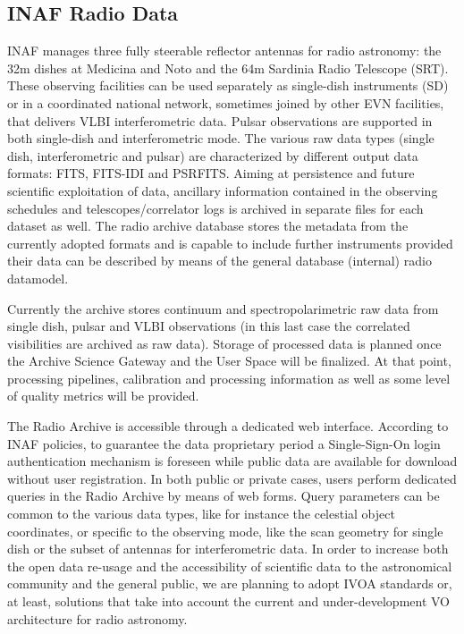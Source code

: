 \documentclass[11pt,a4paper]{ivoa}
\begin{document}
\subsection{INAF Radio Data}
\label{sec:INAF}
INAF manages three fully steerable reflector antennas for radio astronomy: the 32m dishes at Medicina and Noto and the 64m Sardinia Radio Telescope (SRT). These observing facilities can be used separately as single-dish instruments (SD) or in a coordinated national network, sometimes joined by other EVN facilities, that delivers VLBI interferometric data. Pulsar observations are supported in both single-dish and interferometric mode. The various raw data types (single dish, interferometric and pulsar) are characterized by different output data formats: FITS, FITS-IDI and PSRFITS. Aiming at persistence and future scientific exploitation of data, ancillary information contained in the observing schedules and telescopes/correlator logs is archived in separate files for each dataset as well. The radio archive database stores the metadata from the currently adopted formats and is capable to include further instruments provided their data can be described by means of the general database (internal) radio datamodel.

Currently the archive stores continuum and spectropolarimetric raw data from single dish, pulsar and VLBI observations (in this last case the correlated visibilities are archived as raw data). Storage of processed data is planned once the Archive Science Gateway and the User Space will be finalized. At that point, processing pipelines, calibration and processing information as well as some level of quality metrics will be provided.

The Radio Archive is accessible through a dedicated web interface. According to INAF policies, to guarantee the data proprietary period a Single-Sign-On login authentication mechanism is foreseen while public data are available for download without user registration. In both public or private cases, users perform dedicated queries in the Radio Archive by means of web forms. Query parameters can be common to the various data types, like for instance the celestial object coordinates, or specific to the observing mode, like the scan geometry for single dish or the subset of antennas for interferometric data. In order to increase both the open data re-usage and the accessibility of scientific data to the astronomical community and the general public, we are planning to adopt IVOA standards or, at least, solutions that take into account the current and under-development VO architecture for radio astronomy.
\end{document}
